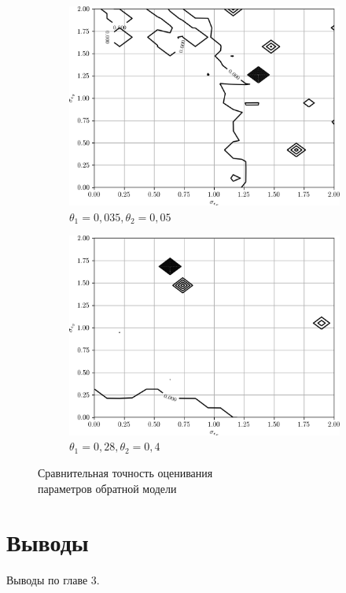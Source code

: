 \begin{figure}[p]
  \begin{subfigure}[b]{\linewidth}
    \centering
    \includegraphics[width=135mm]{fig/nonlinear/inverse/a-0_b-0,035_c-0,005.png}
    \caption{\( \theta_1 = 0{,}035, \theta_2 = 0{,}05 \)}
  \end{subfigure}

  \vspace{2\baselineskip}
  \begin{subfigure}[b]{\linewidth}
    \centering
    \includegraphics[width=135mm]{fig/nonlinear/inverse/a-0_b-0,28_c-0,04.png}
    \caption{\( \theta_1 = 0{,}28, \theta_2 = 0{,}4 \)}
  \end{subfigure}

  \vspace{\baselineskip}
  \caption{
    Сравнительная точность оценивания \\
    параметров обратной модели
  }\label{fig:comparison_nonlinear_inverse}
\end{figure}

\section{Выводы}

Выводы по главе 3.